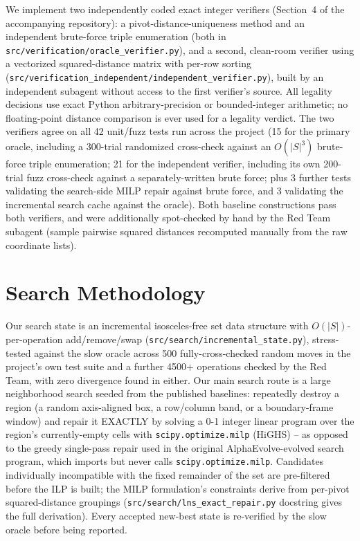 \documentclass[11pt]{article}
\begin{document}
We implement two independently coded exact integer verifiers (Section~4 of the
accompanying repository): a pivot-distance-uniqueness method and an independent
brute-force triple enumeration (both in \texttt{src/verification/oracle\_verifier.py}),
and a second, clean-room verifier using a vectorized squared-distance matrix with
per-row sorting (\texttt{src/verification\_independent/independent\_verifier.py}),
built by an independent subagent without access to the first verifier's source. All
legality decisions use exact Python arbitrary-precision or bounded-integer
arithmetic; no floating-point distance comparison is ever used for a legality
verdict. The two verifiers agree on all 42 unit/fuzz tests run across the project
(15 for the primary oracle, including a 300-trial randomized cross-check against an
$O(|S|^3)$ brute-force triple enumeration; 21 for the independent verifier,
including its own 200-trial fuzz cross-check against a separately-written brute
force; plus 3 further tests validating the search-side MILP repair against brute
force, and 3 validating the incremental search cache against the oracle). Both
baseline constructions pass both verifiers, and were additionally spot-checked by
hand by the Red Team subagent (sample pairwise squared distances recomputed
manually from the raw coordinate lists).

\section{Search Methodology}

Our search state is an incremental isosceles-free set data structure with
$O(|S|)$-per-operation add/remove/swap (\texttt{src/search/incremental\_state.py}),
stress-tested against the slow oracle across 500 fully-cross-checked random moves in
the project's own test suite and a further 4500+ operations checked by the Red Team,
with zero divergence found in either. Our main search route is a large neighborhood
search seeded from the published baselines: repeatedly destroy a region (a random
axis-aligned box, a row/column band, or a boundary-frame window) and repair it
EXACTLY by solving a 0-1 integer linear program over the region's currently-empty
cells with \texttt{scipy.optimize.milp} (HiGHS) -- as opposed to the greedy
single-pass repair used in the original AlphaEvolve-evolved search program, which
imports but never calls \texttt{scipy.optimize.milp}. Candidates individually
incompatible with the fixed remainder of the set are pre-filtered before the ILP is
built; the MILP formulation's constraints derive from per-pivot squared-distance
groupings (\texttt{src/search/lns\_exact\_repair.py} docstring gives the full
derivation). Every accepted new-best state is re-verified by the slow oracle before
being reported.
\end{document}

